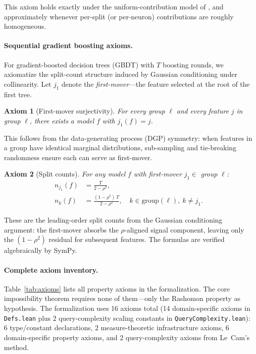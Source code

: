 \documentclass{article}
\newtheorem{axiom}{Axiom}
\newcommand{\GBDT}{\textsc{GBDT}}
\begin{document}
This axiom holds exactly under the uniform-contribution model of \citep{lundberg2017unified}, and approximately whenever per-split (or per-neuron) contributions are roughly homogeneous.

\paragraph{Sequential gradient boosting axioms.}
For gradient-boosted decision trees (\GBDT{}) with $T$ boosting rounds, we axiomatize the split-count structure induced by Gaussian conditioning under collinearity.
Let $j_1$ denote the \emph{first-mover}---the feature selected at the root of the first tree.

\begin{axiom}[First-mover surjectivity]
\label{ax:surjective}
For every group $\ell$ and every feature $j$ in group $\ell$, there exists a model $f$ with $j_1(f) = j$.
\end{axiom}

This follows from the data-generating process (DGP) symmetry: when features in a group have identical marginal distributions, sub-sampling and tie-breaking randomness ensure each can serve as first-mover.

\begin{axiom}[Split counts]
\label{ax:splits}
For any model $f$ with first-mover $j_1 \in$ group $\ell$:
\begin{align}
    n_{j_1}(f) &= \frac{T}{2 - \rho^2}, \label{eq:splits-first} \\
    n_{k}(f) &= \frac{(1-\rho^2)\,T}{2 - \rho^2}, \quad k \in \text{group}(\ell),\ k \neq j_1. \label{eq:splits-other}
\end{align}
\end{axiom}

These are the leading-order split counts from the Gaussian conditioning argument: the first-mover absorbs the $\rho$-aligned signal component, leaving only the $(1-\rho^2)$ residual for subsequent features.
The formulas are verified algebraically by SymPy.

\paragraph{Complete axiom inventory.}
Table~\ref{tab:axioms} lists all property axioms in the formalization.
The core impossibility theorem requires none of them---only the Rashomon property as hypothesis.
The formalization uses 16 axioms total (14 domain-specific axioms in \texttt{Defs.lean} plus 2 query-complexity scaling constants in \texttt{QueryComplexity.lean}): 6 type/constant declarations, 2 measure-theoretic infrastructure axioms, 6 domain-specific property axioms, and 2 query-complexity axioms from Le~Cam's method.
\end{document}
